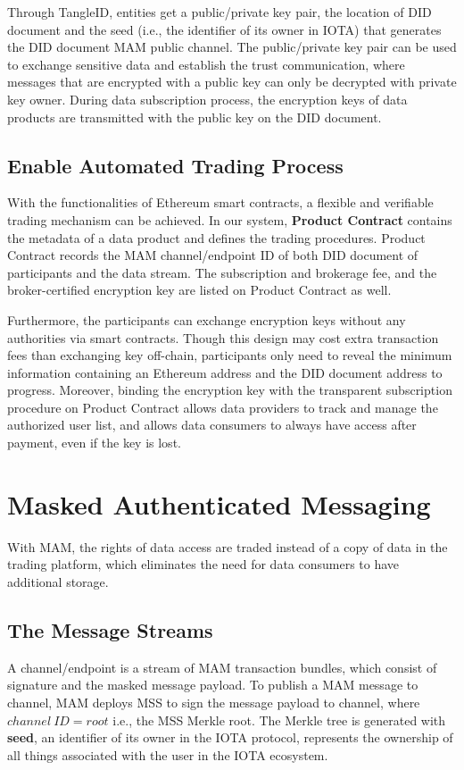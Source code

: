 \documentclass[conference]{IEEEtran}
\begin{document}
Through TangleID, entities get a public/private key pair, the location of DID document and the seed (i.e., the identifier of its owner in IOTA) that generates the DID document MAM public channel. The public/private key pair can be used to exchange sensitive data and establish the trust communication, where messages that are encrypted with a public key can only be decrypted with private key owner. During data subscription process, the encryption keys of data products are transmitted with the public key on the DID document.

\subsection{Enable Automated Trading Process}
With the functionalities of Ethereum smart contracts, a flexible and verifiable trading mechanism can be achieved. In our system, \textbf{Product Contract} contains the metadata of a data product and defines the trading procedures. Product Contract records the MAM channel/endpoint ID of both DID document of participants and the data stream. The subscription and brokerage fee, and the broker-certified encryption key are listed on Product Contract as well. 

Furthermore, the participants can exchange encryption keys without any authorities via smart contracts. Though this design may cost extra transaction fees than exchanging key off-chain, participants only need to reveal the minimum information containing an Ethereum address and the DID document address to progress. Moreover, binding the encryption key with the transparent subscription procedure on Product Contract allows data providers to track and manage the authorized user list, and allows data consumers to always have access after payment, even if the key is lost.  

\section{Masked Authenticated Messaging}
\label{section:MAM}
With MAM, the rights of data access are traded instead of a copy of data in the trading platform, which eliminates the need for data consumers to have additional storage.

\subsection{The Message Streams}
A channel/endpoint is a stream of MAM transaction bundles, which consist of signature and the masked message payload. To publish a MAM message to channel, MAM deploys MSS to sign the message payload to channel, where $channel\ ID = root$ i.e., the MSS Merkle root. The Merkle tree is generated with \textbf{seed}, an identifier of its owner in the IOTA protocol, represents the ownership of all things associated with the user in the IOTA ecosystem.
\end{document}
